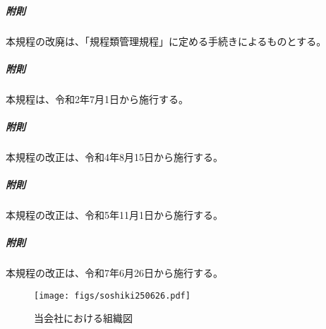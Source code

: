 \documentclass[10pt,a4paper,uplatex,dvipdfmx]{jsarticle}
\begin{document}
\vspace{1cm}
\subparagraph{附則}本規程の改廃は、「規程類管理規程」に定める手続きによるものとする。
\subparagraph{附則}本規程は、令和2年7月1日から施行する。
\subparagraph{附則}本規程の改正は、令和4年8月15日から施行する。 
\subparagraph{附則}本規程の改正は、令和5年11月1日から施行する。 
\subparagraph{附則}本規程の改正は、令和7年6月26日から施行する。 

\clearpage

\begin{figure}[h]
\centering
	\texttt{[image: figs/soshiki250626.pdf]}
\caption{当会社における組織図}
\label{fig:soshiki250626}
\end{figure}
\end{document}
